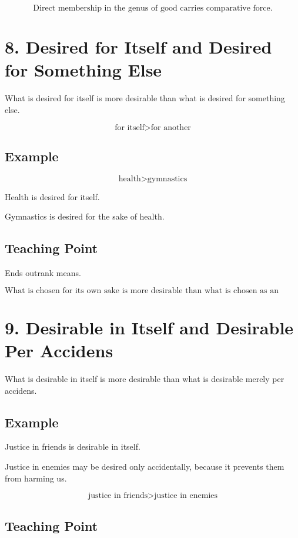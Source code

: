 \documentclass[12pt]{article}
\begin{document}
\[
\boxed{
\text{Direct membership in the genus of good carries comparative force.}
}
\]

\section*{8. Desired for Itself and Desired for Something Else}

What is desired for itself is more desirable than what is desired for something
else.

\[
\text{for itself} > \text{for another}
\]

\subsection*{Example}

\[
\text{health} > \text{gymnastics}
\]

Health is desired for itself.

Gymnastics is desired for the sake of health.

\subsection*{Teaching Point}

Ends outrank means.

\[
\boxed{
\text{What is chosen for its own sake is more desirable than what is chosen as an instrument.}
}
\]

\section*{9. Desirable in Itself and Desirable Per Accidens}

What is desirable in itself is more desirable than what is desirable merely per
accidens.

\subsection*{Example}

Justice in friends is desirable in itself.

Justice in enemies may be desired only accidentally, because it prevents them
from harming us.

\[
\text{justice in friends} > \text{justice in enemies}
\]

\subsection*{Teaching Point}
\end{document}
